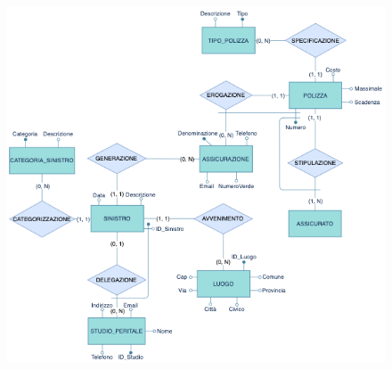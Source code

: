 \documentclass[a4paper,12pt]{report}
\begin{document}
\\
\begin{figure}[ht]
    \begin{center}
        \centering
        \includegraphics[width=\textwidth]{img/Assicurazione.png}
    \end{center}
\end{figure}
\clearpage
\end{document}
